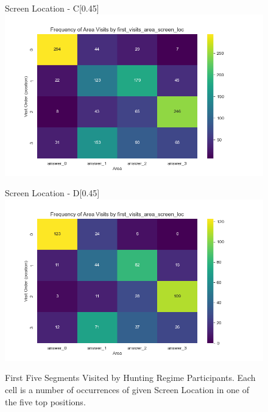 \documentclass{article}
\begin{document}
\begin{figure}[H]
          \begin{subcaptionbox}{Screen Location - C\label{fig:c}}[0.45\textwidth]
            {\centering\includegraphics[width=\linewidth]{plots/visits/matrix__first_visits_area_screen_loc_hunters_C.png}}
          \end{subcaptionbox}
          \hfill
          \begin{subcaptionbox}{Screen Location - D\label{fig:d}}[0.45\textwidth]
            {\centering\includegraphics[width=\linewidth]{plots/visits/matrix__first_visits_area_screen_loc_hunters_D.png}}
          \end{subcaptionbox}
          
          \caption{First Five Segments Visited by Hunting Regime Participants. Each cell is a number of occurrences of given Screen Location in one of the five top positions.}
          \label{fig:hunt_first_loc}
        \end{figure}

\end{document}
